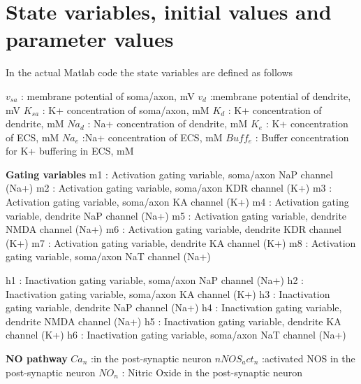 \documentclass[fleqn]{report}
\numberwithin{equation}{section}
\numberwithin{equation}{section}
\newcommand{\Ca}{\text{Ca$^{2+}$}}
\begin{document}
			
				\chapter{State variables, initial values and parameter values}
				In the actual Matlab code the state variables are defined as follows 
				            
				            $v_{sa}$      : membrane potential of soma/axon, mV
				            $v_d$        :membrane potential of dendrite, mV
				            $K_{sa}$      : K+ concentration of soma/axon, mM
				            $K_d$ :  K+ concentration of dendrite, mM
				            $Na_d$ :  Na+ concentration of dendrite, mM
				            $K_e$ : K+ concentration of ECS, mM
				            $Na_e$ :Na+ concentration of ECS, mM
				            $Buff_e$ : Buffer concentration for K+ buffering in ECS, mM
				 
				          
				            
				             \textbf{Gating variables}
				            m1 : Activation gating variable, soma/axon NaP channel (Na+)
				            m2 : Activation gating variable, soma/axon KDR channel (K+)
				            m3 : Activation gating variable, soma/axon KA channel (K+)
				            m4 : Activation gating variable, dendrite NaP channel (Na+)
				            m5 : Activation gating variable, dendrite NMDA channel (Na+)
				            m6 : Activation gating variable, dendrite KDR channel (K+)
				            m7 : Activation gating variable, dendrite KA channel (K+)
				            m8 : Activation gating variable, soma/axon NaT channel (Na+)
				            
				            h1 : Inactivation gating variable, soma/axon NaP channel (Na+)
				            h2 : Inactivation gating variable, soma/axon KA channel (K+)
				            h3 : Inactivation gating variable, dendrite NaP channel (Na+)
				            h4 : Inactivation gating variable, dendrite NMDA channel (Na+)
				            h5 : Inactivation gating variable, dendrite KA channel (K+)
				            h6 : Inactivation gating variable, soma/axon NaT channel (Na+)
				            
				            \textbf{NO pathway} 
				            $Ca_n$ :\Ca in the post-synaptic neuron                  
				            $nNOS_act_n$ :activated NOS in the post-synaptic neuron
				            $NO_n$ : Nitric Oxide in the post-synaptic neuron
				            
\end{document}
